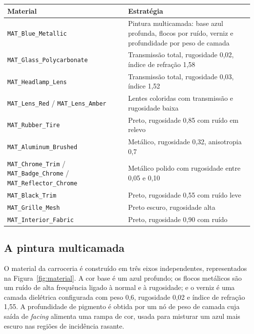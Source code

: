 \begin{quadro}[htbp]
\centering
\caption{Materiais definidos e estrat\'egia de sombreamento}
\label{qua:materiais}
\footnotesize
\begin{tabular}{>{\raggedright\arraybackslash}p{4.0cm}>{\raggedright\arraybackslash}p{8.8cm}}
\toprule
\textbf{Material} & \textbf{Estrat\'egia} \\
\midrule
\texttt{MAT\_Blue\_Metallic} & Pintura multicamada: base azul profunda, flocos por ru\'ido, verniz e profundidade por peso de camada \\
\texttt{MAT\_Glass\_}\allowbreak\texttt{Polycarbonate} & Transmiss\~ao total, rugosidade 0,02, \'indice de refra{\c{c}}\~ao 1,58 \\
\texttt{MAT\_Headlamp\_Lens} & Transmiss\~ao total, rugosidade 0,03, \'indice 1,52 \\
\texttt{MAT\_Lens\_Red} / \texttt{MAT\_Lens\_Amber} & Lentes coloridas com transmiss\~ao e rugosidade baixa \\
\texttt{MAT\_Rubber\_Tire} & Preto, rugosidade 0,85 com ru\'ido em relevo \\
\texttt{MAT\_Aluminum\_Brushed} & Met\'alico, rugosidade 0,32, anisotropia 0,7 \\
\texttt{MAT\_Chrome\_Trim} / \texttt{MAT\_Badge\_Chrome} / \texttt{MAT\_Reflector\_Chrome} & Met\'alico polido com rugosidade entre 0,05 e 0,10 \\
\texttt{MAT\_Black\_Trim} & Preto, rugosidade 0,55 com ru\'ido leve \\
\texttt{MAT\_Grille\_Mesh} & Preto escuro, rugosidade alta \\
\texttt{MAT\_Interior\_Fabric} & Preto, rugosidade 0,90 com ru\'ido \\
\bottomrule
\end{tabular}
\end{quadro}

\subsection{A pintura multicamada}

O material da carroceria \'e constru\'ido em tr\^es eixos independentes, representados na
Figura~\ref{fig:material}. A cor base \'e um azul profundo; os flocos met\'alicos s\~ao um ru\'ido
de alta frequ\^encia ligado \`a normal e \`a rugosidade; e o verniz \'e uma camada
diel\'etrica configurada com peso 0,6, rugosidade 0,02 e \'indice de refra{\c{c}}\~ao 1,55. A
profundidade de pigmento \'e obtida por um n\'o de peso de camada cuja sa\'ida de
\emph{facing} alimenta uma rampa de cor, usada para misturar um azul mais escuro nas regi\~oes de
incid\^encia rasante.

